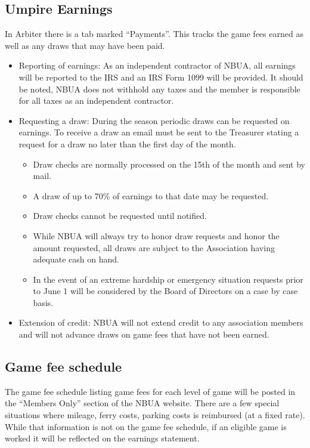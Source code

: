 \documentclass[letterpaper,11pt,colorlinks=true,allcolors=blue]{article}
\begin{document}
\subsection*{Umpire Earnings}
In Arbiter there is a tab marked “Payments”. This tracks the game fees earned as well as any draws that may have been paid. 
\begin{itemize}
\item  Reporting of earnings: As an independent contractor of NBUA, all earnings will be reported to the IRS and an IRS Form 1099 will be provided. It should be noted, NBUA does not withhold any taxes and the member is responsible for all taxes as an independent contractor. 
\item  Requesting a draw: During the season periodic draws can be requested on earnings. To receive a draw an email must be sent to the Treasurer stating a request for a draw no later than the first day of the month.
\begin{itemize}
\item  Draw checks are normally processed on the 15th of the month and sent by mail.
\item  A draw of up to 70\% of earnings to that date may be requested.
\item  Draw checks cannot be requested until notified.
\item  While NBUA will always try to honor draw requests and honor the amount requested, all draws are subject to the Association having adequate cash on hand.
\item  In the event of an extreme hardship or emergency situation requests prior to June 1 will be considered by the Board of Directors on a case by case basis. 
\end{itemize}

\item  Extension of credit: NBUA will not extend credit to any association members and will not advance draws on game fees that have not been earned. 
\end{itemize}

\subsection*{Game fee schedule} 
The game fee schedule listing game fees for each level of game will be posted in the “Members Only” section of the NBUA website. There are a few special situations where mileage, ferry costs, parking costs is reimbursed (at a fixed rate). While that information is not on the game fee schedule, if an eligible game is worked it will be reflected on the earnings statement. 
\end{document}
